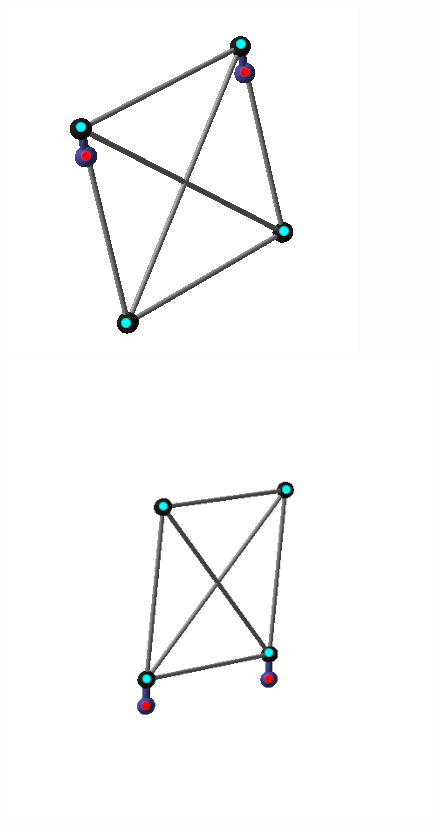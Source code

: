 \begin{figure}[h!]
    \centering
        \begin{minipage}{0.3\textwidth}
            \centering
            \includegraphics[width=\textwidth]{figures/noninverted_cloth_col_small.png} %
        \end{minipage}
        \begin{minipage}{0.4\textwidth}
            \centering
            \includegraphics[width=\textwidth]{figures/inverted_cloth_col_small.png} %
        \end{minipage}\hfill
        

\end{figure}
